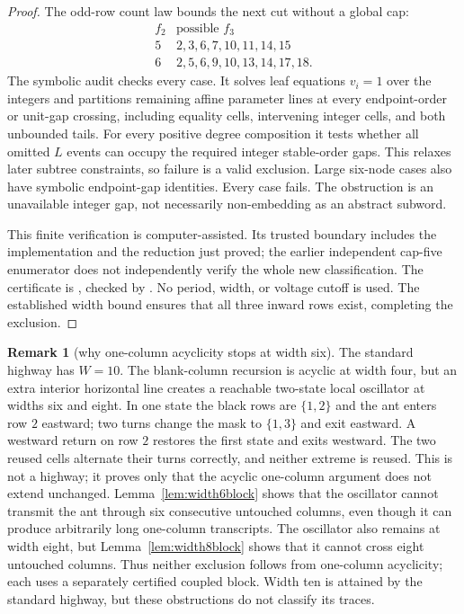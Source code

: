 \documentclass[11pt,letterpaper]{article}
\theoremstyle{plain}
\theoremstyle{definition}
\newtheorem{remark}[theorem]{Remark}
\begin{document}
\begin{NoHyper}
\begin{proof}
The odd-row count law bounds the next cut without a global cap:
\[
\begin{array}{c|l}
f_2&\text{possible }f_3\\ \hline
5&2,3,6,7,10,11,14,15\\
6&2,5,6,9,10,13,14,17,18.
\end{array}
\]
The symbolic audit checks every case. It solves leaf equations $v_i=1$
over the integers and partitions remaining affine parameter lines at
every endpoint-order or unit-gap crossing, including equality cells,
intervening integer cells, and both unbounded tails. For every positive
degree composition it tests whether all omitted $L$ events can occupy
the required integer stable-order gaps. This relaxes later subtree
constraints, so failure is a valid exclusion. Large six-node cases also
have symbolic endpoint-gap identities. Every case fails. The obstruction
is an unavailable integer gap, not necessarily non-embedding as an
abstract subword.

This finite verification is computer-assisted. Its trusted boundary
includes the implementation and the reduction just proved; the earlier
independent cap-five enumerator does not independently verify the whole
new classification. The certificate is
, checked by
.
No period, width, or voltage cutoff is used. The established width
bound ensures that all three inward rows exist, completing the exclusion.
\end{proof}

\begin{remark}[why one-column acyclicity stops at width six]\label{rem:width4}
The standard highway has $W=10$.  The blank-column recursion is acyclic at width
four, but an extra interior horizontal line creates a reachable two-state local
oscillator at widths six and eight.  In one state the black rows are $\{1,2\}$ and
the ant enters row $2$ eastward; two turns change the mask to $\{1,3\}$ and exit
eastward.  A westward return on row $2$ restores the first state and exits westward.
The two reused cells alternate their turns correctly, and neither extreme is reused.
This is not a highway; it proves only that the acyclic one-column argument does not
extend unchanged.  Lemma~\ref{lem:width6block} shows that the oscillator cannot
transmit the ant through six consecutive untouched columns, even though it can
produce arbitrarily long one-column transcripts.  The oscillator also remains at
width eight, but Lemma~\ref{lem:width8block} shows that it cannot cross eight
untouched columns.  Thus neither exclusion follows from one-column acyclicity; each
uses a separately certified coupled block.  Width ten is attained by the standard
highway, but these obstructions do not classify its traces.
\end{remark}


\end{NoHyper}
\end{document}
